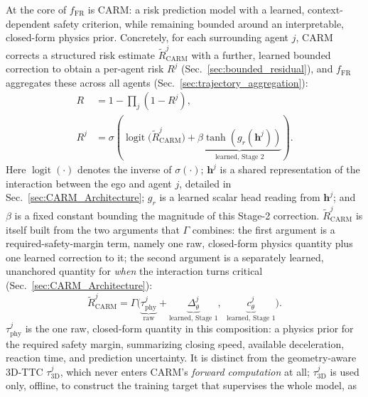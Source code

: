 \documentclass[letterpaper, 10 pt, conference]{ieeeconf}  %
\begin{document}
At the core of $f_{\mathrm{FR}}$ is CARM: a risk prediction model with a
learned, context-dependent safety criterion, while remaining bounded
around an interpretable, closed-form physics prior. Concretely, for each
surrounding agent $j$, CARM corrects a structured risk estimate
$\widetilde R_{\mathrm{CARM}}^{j}$ with a further, learned bounded
correction to obtain a per-agent risk $R^{j}$ (Sec.~\ref{sec:bounded_residual}),
and $f_{\mathrm{FR}}$ aggregates these across all agents
(Sec.~\ref{sec:trajectory_aggregation}):
\begin{equation}
\begin{aligned}
R&=1-\prod_{j}\left(1-R^{j}\right),\\[2pt]
R^{j}&=\sigma\!\left(
\operatorname{logit}\big(\widetilde R_{\mathrm{CARM}}^{j}\big)
+
\underbrace{\beta\tanh\!\left(g_r(\bm h^{j})\right)}_{\text{learned, Stage 2}}
\right).
\end{aligned}
\label{eq:future_risk_decomposition}
\end{equation}
Here $\operatorname{logit}(\cdot)$ denotes the inverse of $\sigma(\cdot)$;
$\bm h^{j}$ is a shared representation of the interaction between the ego
and agent $j$, detailed in Sec.~\ref{sec:CARM_Architecture}; $g_r$ is a
learned scalar head reading from $\bm h^{j}$; and $\beta$ is a fixed
constant bounding the magnitude of this Stage-2 correction.
$\widetilde R_{\mathrm{CARM}}^{j}$ is itself built from the two arguments
that $\Gamma$ combines: the first argument is a required-safety-margin
term, namely one raw, closed-form physics quantity plus one learned
correction to it; the second argument is a separately learned, unanchored
quantity for \emph{when} the interaction turns critical
(Sec.~\ref{sec:CARM_Architecture}):
\begin{equation}
\widetilde R_{\mathrm{CARM}}^{j}
=
\Gamma\!\Big(
\underbrace{\tau_{\mathrm{phy}}^{j}}_{\text{raw}}+\underbrace{\Delta_{\theta}^{j}}_{\text{learned, Stage 1}},\ \
\underbrace{c_{\theta}^{j}}_{\text{learned, Stage 1}}
\Big).
\label{eq:carm_score_ingredients}
\end{equation}
$\tau_{\mathrm{phy}}^{j}$ is the one raw, closed-form quantity in this
composition: a physics prior for the required safety margin, summarizing
closing speed, available deceleration, reaction time, and prediction
uncertainty. It is distinct from the geometry-aware 3D-TTC
$\tau_{\mathrm{3D}}^{j}$, which never enters CARM's \emph{forward
computation} at all; $\tau_{\mathrm{3D}}^{j}$ is used only, offline, to
construct the training target that supervises the whole model, as
\end{document}
